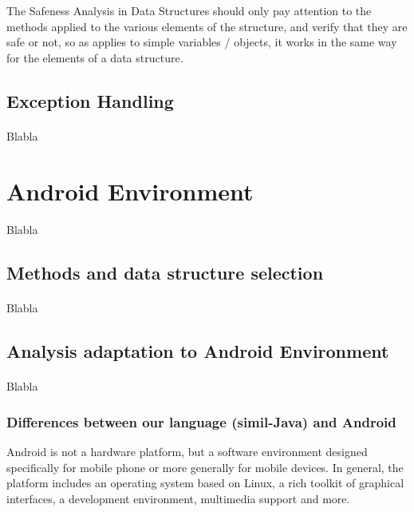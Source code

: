 \documentclass[letterpaper,twocolumn,10pt]{article}
\begin{document}
The Safeness Analysis in Data Structures should only pay attention to the methods applied to the various elements of the structure, and verify that they are safe or not, so as applies to simple variables / objects, it works in the same way for the elements of a data structure.


\subsection{Exception Handling}
\paragraph{}
Blabla


\section{Android Environment}
\paragraph{}
Blabla

\subsection{Methods and data structure selection}
\paragraph{}
Blabla

\subsection{Analysis adaptation to Android Environment}
\paragraph{}
Blabla

\subsubsection{Differences between our language (simil-Java) and Android}
Android is not a hardware platform, but a software environment designed specifically for mobile phone or more generally for mobile devices. In general, the platform includes an operating system based on Linux, a rich toolkit of graphical interfaces, a development environment, multimedia support and more.\\
\end{document}
